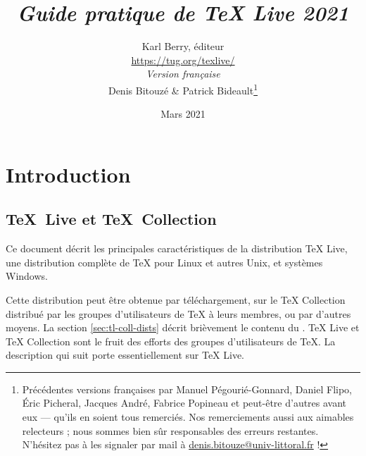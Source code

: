 \documentclass[german, english, french]{article}
\renewcommand{\TL}{\TeX{} Live\xspace}%
\renewcommand{\TK}{\TeX{} Collection\xspace}%
\newcommand*\semail[1]{\href{mailto:#1}{#1}}
\begin{document}
\title{%
  \huge \emph{Guide pratique de \TL 2021}%
}

\author{
  Karl Berry, éditeur \\[3mm]
  \url{https://tug.org/texlive/} \\[6mm]
  \textit{Version française} \\[3mm]
  Denis Bitouzé \& Patrick Bideault\thanks{%
    Précédentes versions françaises par Manuel Pégourié-Gonnard, Daniel Flipo,
    Éric Picheral, Jacques André, Fabrice Popineau et peut-être d'autres avant
    eux --- qu'ils en soient tous remerciés. Nos remerciements aussi aux
    aimables relecteurs ; nous sommes bien sûr responsables des erreurs
    restantes. N'hésitez pas à les signaler par mail
    à \semail{denis.bitouze@univ-littoral.fr} !%
  }%
}


\date{Mars 2021}

\maketitle

\begin{multicols}{2}
  \tableofcontents
\end{multicols}

\section{Introduction}
\label{sec:intro}

\subsection{\protect\TeX\ Live et \protect\TeX\ Collection}

Ce document décrit les principales caractéristiques de la distribution \TL{},
une distribution complète de \TeX{} pour Linux et autres Unix, \MacOSX{} et
systèmes Windows.

Cette distribution peut être obtenue par téléchargement, sur le \DVD{} \TK{}
distribué par les groupes d'utilisateurs de \TeX{} à leurs membres, ou par
d'autres moyens.  La section \ref{sec:tl-coll-dists} décrit brièvement le
contenu du \DVD.  \TL{} et \TK{} sont le fruit des efforts des groupes
d'utilisateurs de \TeX. La description qui suit porte essentiellement sur \TL{}.
\end{document}
